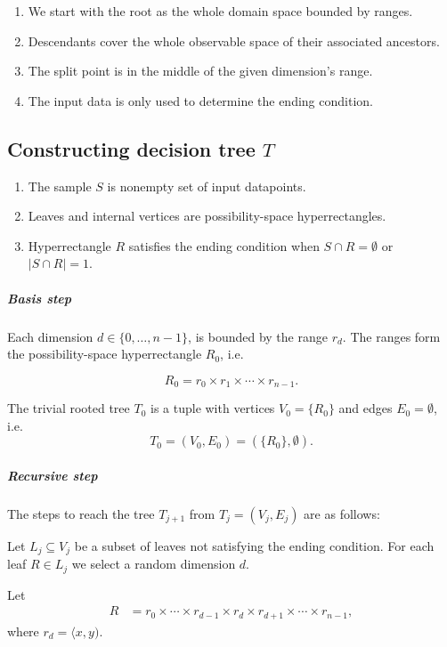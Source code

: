 \begin{enumerate}
    \item We start with the root as the whole domain space bounded by ranges.
    \item Descendants cover the whole observable space of their associated ancestors. 
    \item The split point is in the middle of the given dimension’s range.
    \item The input data is only used to determine the ending condition.
\end{enumerate}

\subsection{Constructing decision tree $T$}

\begin{enumerate}
    \item The sample \(S\) is nonempty set of input datapoints.
    \item Leaves and internal vertices are possibility-space hyperrectangles. 
    \item Hyperrectangle $R$ satisfies the ending condition when \(S \cap R = \emptyset\) or \(| S \cap R | = 1\).
\end{enumerate}



\subparagraph{Basis step}

Each dimension \(d \in\{0, \dots, n-1\}\), is bounded by the range \(r_d\). The ranges form the possibility-space hyperrectangle \(R_0\), i.e.

\[R_0 =  r_0 \times r_1 \times \cdots \times r_{n-1}.\]

The trivial rooted tree \(T_0\) is a tuple with
vertices \(V_0 = \{R_0\}\) and edges \(E_0 = \emptyset\), i.e.
\[T_0= (V_0, E_0) = (\{R_0\},\emptyset).\]

\subparagraph{Recursive step}

The steps to reach the tree \(T_{j+1}\) from \(T_{j} = (V_j, E_j)\) are
as follows:

Let \(L_j \subseteq V_j\) be a subset of leaves not satisfying the
ending condition.
For each leaf \(R \in L_j\) we
select a random dimension \(d\).

Let
\begin{align}
R &= r_0 \times  \cdots \times r_{d-1} \times  r_d\times r_{d+1} \times \cdots \times r_{n-1},
\end{align}
where $r_d = \langle x, y )$.

